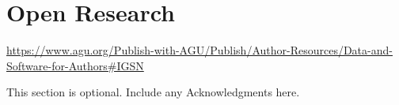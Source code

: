 \documentclass[draft]{agujournal2019}
\begin{document}
\section{Open Research}

\url{https://www.agu.org/Publish-with-AGU/Publish/Author-Resources/Data-and-Software-for-Authors#IGSN}

\acknowledgments
This section is optional. Include any Acknowledgments here.



 





%
%
\end{document}
